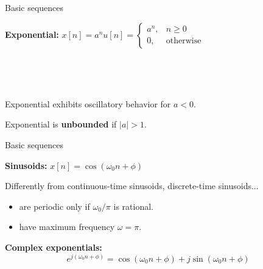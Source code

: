 \documentclass[10pt]{beamer}
\begin{document}
%
\begin{frame}{Basic sequences}
	
\textbf{Exponential:} $\displaystyle 
x[n] = a^nu[n] = \begin{cases}
a^n, & n \geq 0 \\
0, & \text{otherwise}
\end{cases}$
	
\begin{figure}[h!] 
	\centering 
	\begin{subfigure}[h!]{0.32\textwidth} 
	\end{subfigure}%
	~ %
	\begin{subfigure}[h!]{0.32\textwidth} 
	\end{subfigure}%

	\begin{subfigure}[h!]{0.32\textwidth} 
	\end{subfigure}%
	~ %
	\begin{subfigure}[h!]{0.32\textwidth} 
	\end{subfigure}%
\end{figure}

Exponential exhibits oscillatory behavior for $a < 0$.

Exponential is \textbf{unbounded} if $|a| > 1$.
\end{frame}

%
\begin{frame}{Basic sequences}
	
	\textbf{Sinusoids:} $\displaystyle
	x[n] = \cos(\omega_0 n + \phi)$
	\vspace{-0.2cm}
	\begin{figure}[t!]
		\centering
		\resizebox{0.4\linewidth}{!}{}
		\label{fig:sinusoid}
	\end{figure}

	Differently from continuous-time sinusoids, discrete-time sinusoids...
	\begin{itemize}
		\item are periodic only if $\omega_0/\pi$ is rational.
		\item have maximum frequency $\omega = \pi$.
	\end{itemize}
	
	\pause	
	\textbf{Complex exponentials:} 
	\begin{equation*}
		e^{j(\omega_0n + \phi)} = \cos(\omega_0 n + \phi) + j\sin(\omega_0 n + \phi) \tag{from Euler's equation}
	\end{equation*}
\end{frame}
\end{document}
